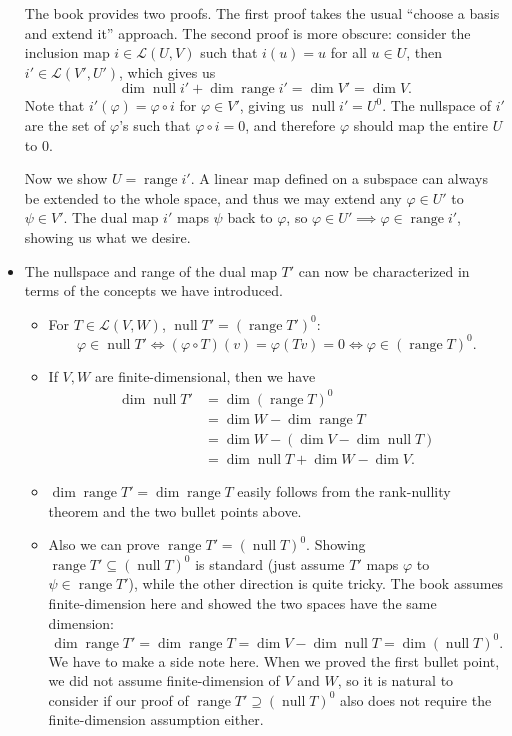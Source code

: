 \documentclass[11pt]{article}
\newcommand{\n}{\operatorname{null}}
\renewcommand{\r}{\operatorname{range}}
\renewcommand{\d}{\dim}
\newcommand{\LVW}{\mathcal{L}(V,W)}
\renewcommand{\phi}{\varphi}
\begin{document}
\begin{itemize}
    The book provides two proofs. The first proof takes the usual ``choose a basis and extend it'' approach. The second proof is more obscure: consider the inclusion map $i \in \mathcal{L}(U,V)$ such that $i(u) = u$ for all $u \in U$, then $i' \in \mathcal{L}(V',U')$, which gives us $$\d \n i' + \d \r i' = \d V' = \d V.$$ Note that $i'(\phi) = \phi \circ i$ for $\phi \in V'$, giving us $\n i' = U^0$. The nullspace of $i'$ are the set of $\phi$'s such that $\phi \circ i = 0$, and therefore $\phi$ should map the entire $U$ to $0$.
    
    Now we show $U = \r i'$. A linear map defined on a subspace can always be extended to the whole space, and thus we may extend any $\phi \in U'$ to $\psi \in V'$. The dual map $i'$ maps $\psi$ back to $\phi$, so $\phi \in U' \implies \phi \in \r i'$, showing us what we desire.
    \item The nullspace and range of the dual map $T'$ can now be characterized in terms of the concepts we have introduced.
    \begin{itemize}
        \item For $T \in \LVW$, $\n T' = (\r T')^0$: $$\phi \in \n T' \Longleftrightarrow (\phi \circ T)(v) = \phi(Tv) = 0 \Longleftrightarrow \phi \in (\r T)^0.$$
        \item If $V,W$ are finite-dimensional, then we have
        \begin{align*}
            \d \n T' & = \d (\r T)^0 \\
            & = \d W - \d \r T \\
            & = \d W - (\d V - \d \n T) \\
            & = \d \n T + \d W - \d V.
        \end{align*}
        \item $\d \r T' = \d \r T$ easily follows from the rank-nullity theorem and the two bullet points above.
        \item Also we can prove $\r T' = (\n T)^0$. Showing $\r T' \subseteq (\n T)^0$ is standard (just assume $T'$ maps $\phi$ to $\psi \in \r T'$), while the other  direction is quite tricky. The book assumes finite-dimension here and showed the two spaces have the same dimension: $$\d \r T' = \d \r T = \d V - \d \n T = \d (\n T)^0.$$
        We have to make a side note here. When we proved the first bullet point, we did not assume finite-dimension of $V$ and $W$, so it is natural to consider if our proof of $\r T' \supseteq (\n T)^0$ also does not require the finite-dimension assumption either.
        

\end{itemize}
\end{itemize}
\end{document}
